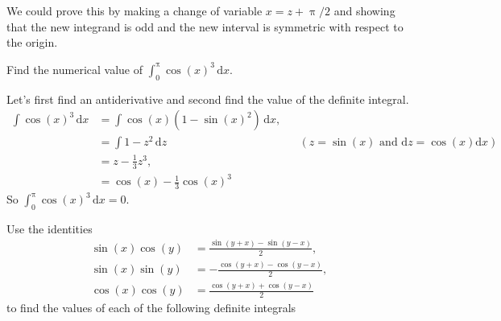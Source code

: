 \documentclass[12pt,fleqn,answers]{exam}
\begin{document}
\begin{questions}
\begin{solution}
\quad We could prove this by making a change of variable $x = z + \uppi/2$
and showing that the new integrand is odd and the new interval is
symmetric with respect to the origin.
\end{solution}
\newpage
\question [1] Find the numerical value of $\int_0^\uppi \cos(x)^3 \, \mathrm{d} x$.
\begin{solution}[2.5in] Let's first find an antiderivative 
    and second find the value of the definite integral.
\begin{align*}
  \int \cos(x)^3 \, \mathrm{d} x &= \int \cos(x) (1-\sin(x)^2) \, \mathrm{d} x, \\
                                 &= \int 1 - z^2 \, \mathrm{d}z &&(z = \sin(x) \text{ and } \mathrm{d}z = \cos(x) \mathrm{d} x)\\
                                 &= z - \frac{1}{3} z^3,\\
                                 &= \cos(x ) - \frac{1}{3} \cos(x)^3
  \end{align*}                    
So $\int_0^\uppi \cos(x)^3 \, \mathrm{d} x  = 0$.
\end{solution}

\newpage 
\question Use the identities
\begin{align*}
    \sin{(x)} \cos{(y)} &= \frac{\sin{\left( y+x\right) }-\sin{\left( y-x\right) }}{2}, \\
    \sin{(x)} \sin{(y)} &=  -\frac{\cos{\left( y+x\right) }-\cos{\left( y-x\right) }}{2}, \\
    \cos{(x)} \cos{(y)} &= \frac{\cos{\left( y+x\right) }+\cos{\left( y-x\right) }}{2}  
\end{align*}
to find the values of each of the following definite integrals

\end{questions}
\end{document}
